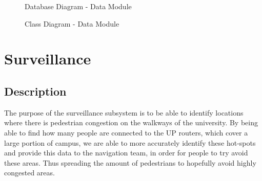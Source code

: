 \documentclass[english]{article}
\begin{document}
        \begin{figure}[H]
            \centering	            
            \centerline{}
            \caption{Database Diagram - Data Module}
        \end{figure}     
        
        \begin{figure}[H]
            \centering	            
            \centerline{}
            \caption{Class Diagram - Data Module}
        \end{figure} 

    \newpage
    \section{Surveillance}    
        \subsection{Description}    
            The purpose of the surveillance subsystem is to be able to identify locations where there is pedestrian congestion on the walkways of the university.
            By being able to find how many people are connected to the UP routers, which cover a large portion of campus, we are able to more accurately identify these hot-spots and provide this data to the navigation team, in order for people to try avoid these areas. Thus spreading the amount of pedestrians to hopefully avoid highly congested areas. 
\end{document}

